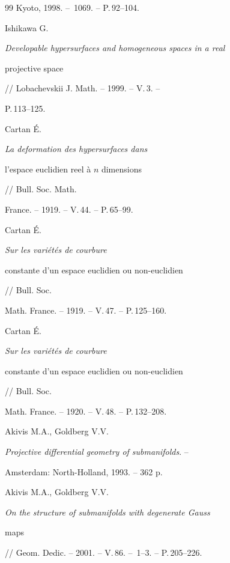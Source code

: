 \begin{thebibliography}{99}
Kyoto, 1998. -- \No\,1069. -- P.\,92--104.







Ishikawa G.


{\em Developable hypersurfaces and homogeneous spaces in a real


projective space} // Lobachevskii J. Math. -- 1999. -- V.\,3. --


P.\,113--125.







Cartan \'E. {\em La deformation des hypersurfaces dans


l'espace euclidien reel \`a $n$ dimensions} // Bull. Soc. Math.


France. -- 1919. -- V.\,44. -- P.\,65--99.







Cartan \'E. {\em Sur les vari\'{e}t\'{e}s de courbure


constante d'un espace euclidien ou non-euclidien} // Bull. Soc.


Math. France. -- 1919. -- V.\,47. -- P.\,125--160.







Cartan \'E. {\em Sur les vari\'{e}t\'{e}s de courbure


constante d'un espace euclidien ou non-euclidien} // Bull. Soc.


Math. France. -- 1920. -- V.\,48. -- P.\,132--208.







Akivis M.A., Goldberg V.V. %


{\em Projective differential geometry of submanifolds}. --


Amsterdam: North-Holland, 1993. -- 362 p.







Akivis M.A., Goldberg V.V.


{\em On the structure of submanifolds with degenerate Gauss


maps} // Geom. Dedic. -- 2001. -- V.\,86. -- \No\,1--3. -- P.\,205--226.






\end{thebibliography}
